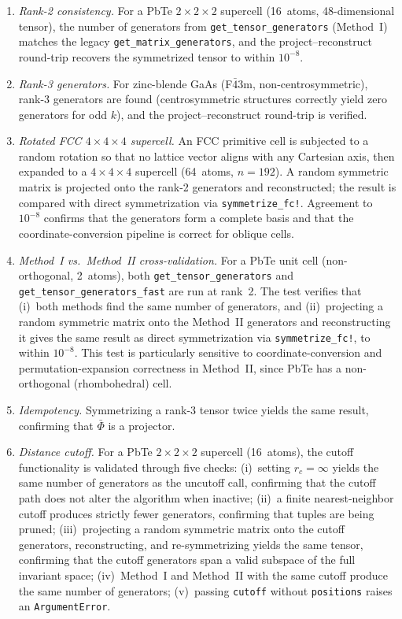 \documentclass[twocolumn,amsmath,amssymb,aps,prb,10pt,floatfix]{revtex4-2}
\begin{document}
\begin{enumerate}
\item \emph{Rank-2 consistency.} For a PbTe $2\times2\times2$ supercell (16~atoms, 48-dimensional tensor), the number of generators from \texttt{get\_tensor\_generators} (Method~I) matches the legacy \texttt{get\_matrix\_generators}, and the project--reconstruct round-trip recovers the symmetrized tensor to within $10^{-8}$.
\item \emph{Rank-3 generators.} For zinc-blende GaAs (F$\bar{4}$3m, non-centrosymmetric), rank-3 generators are found (centrosymmetric structures correctly yield zero generators for odd $k$), and the project--reconstruct round-trip is verified.
\item \emph{Rotated FCC $4\times4\times4$ supercell.} An FCC primitive cell is subjected to a random rotation so that no lattice vector aligns with any Cartesian axis, then expanded to a $4\times4\times4$ supercell (64~atoms, $n=192$).
A random symmetric matrix is projected onto the rank-2 generators and reconstructed; the result is compared with direct symmetrization via \texttt{symmetrize\_fc!}.
Agreement to $10^{-8}$ confirms that the generators form a complete basis and that the coordinate-conversion pipeline is correct for oblique cells.
\item \emph{Method~I vs.\ Method~II cross-validation.} For a PbTe unit cell (non-orthogonal, 2~atoms), both \texttt{get\_tensor\_generators} and \texttt{get\_tensor\_generators\_fast} are run at rank~2.
The test verifies that (i)~both methods find the same number of generators, and (ii)~projecting a random symmetric matrix onto the Method~II generators and reconstructing it gives the same result as direct symmetrization via \texttt{symmetrize\_fc!}, to within $10^{-8}$.
This test is particularly sensitive to coordinate-conversion and permutation-expansion correctness in Method~II, since PbTe has a non-orthogonal (rhombohedral) cell.
\item \emph{Idempotency.} Symmetrizing a rank-3 tensor twice yields the same result, confirming that $\bar\Phi$ is a projector.
\item \emph{Distance cutoff.} For a PbTe $2\times2\times2$ supercell (16~atoms), the cutoff functionality is validated through five checks:
(i)~setting $r_c = \infty$ yields the same number of generators as the uncutoff call, confirming that the cutoff path does not alter the algorithm when inactive;
(ii)~a finite nearest-neighbor cutoff produces strictly fewer generators, confirming that tuples are being pruned;
(iii)~projecting a random symmetric matrix onto the cutoff generators, reconstructing, and re-symmetrizing yields the same tensor, confirming that the cutoff generators span a valid subspace of the full invariant space;
(iv)~Method~I and Method~II with the same cutoff produce the same number of generators;
(v)~passing \texttt{cutoff} without \texttt{positions} raises an \texttt{ArgumentError}.
\end{enumerate}
\end{document}
